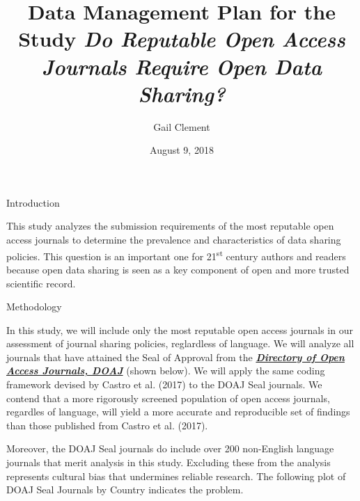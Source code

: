 \documentclass[ignorenonframetext,]{beamer}
\title{Data Management Plan for the Study \emph{Do Reputable Open Access
Journals Require Open Data Sharing?}}
\author{Gail Clement}
\date{August 9, 2018}
\begin{document}
\frame{\titlepage}

\begin{frame}[fragile]{Introduction}

This study analyzes the submission requirements of the most reputable
open access journals to determine the prevalence and characteristics of
data sharing policies. This question is an important one for
21\textsuperscript{st} century authors and readers because open data
sharing is seen as a key component of open and more trusted scientific
record.


\begin{block}{Methodology}

In this study, we will include only the most reputable open access
journals in our assessment of journal sharing policies, reglardless of
language. We will analyze all journals that have attained the Seal of
Approval from the \href{http://doaj.org}{\emph{\textbf{Directory of Open
Access Journals, DOAJ}}} (shown below). We will apply the same coding
framework devised by Castro et al. (2017) to the DOAJ Seal journals. We
contend that a more rigorously screened population of open access
journals, regardles of language, will yield a more accurate and
reproducible set of findings than those published from Castro et al.
(2017).

Moreover, the DOAJ Seal journals do include over 200 non-English
language journals that merit analysis in this study. Excluding these
from the analysis represents cultural bias that undermines reliable
research. The following plot of DOAJ Seal Journals by Country indicates
the problem.


\end{block}
\end{frame}
\end{document}
